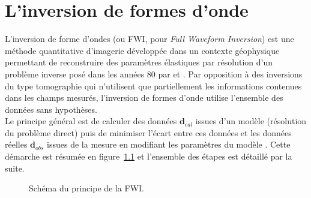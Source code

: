 \chapter{L'inversion de formes d'onde \label{fwi}}

L'inversion de forme d'ondes (ou FWI, pour \emph{Full Waveform Inversion}) est une méthode quantitative d'imagerie développée dans un contexte géophysique permettant de reconstruire des paramètres élastiques par résolution d'un problème inverse posé dans les années 80 par \cite{lailly} et \cite{tarantola_84}. Par opposition à des inversions du type tomographie qui n'utilisent que partiellement les informations contenues dans les champs mesurés, l'inversion de formes d'onde utilise l'ensemble des données sans hypothèses. \\

Le principe général est de calculer des données $\bm{d}_{cal}$ issues d'un modèle (résolution du problème direct)  puis de minimiser l'écart entre ces données et les données réelles $\bm{d}_{obs}$ issues de la mesure en modifiant les paramètres du modèle \citep{virieux_review}. Cette démarche est résumée en figure~\ref{schema_fwi} et l'ensemble des étapes est détaillé par la suite.


\begin{figure}[!h]
	\caption{Schéma du principe de la FWI.\label{schema_fwi}}
\end{figure}

